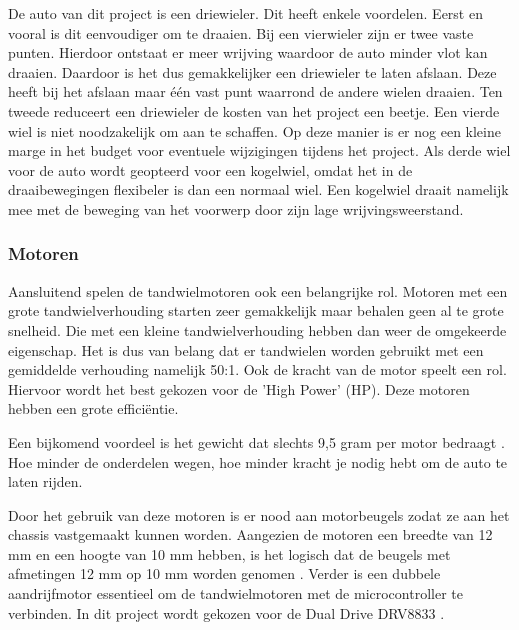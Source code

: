 \documentclass[a4paper,twoside,kulak]{kulakreport} %
\begin{document}
De auto van dit project is een driewieler. Dit heeft enkele voordelen. Eerst en vooral is dit eenvoudiger om te draaien. Bij een vierwieler zijn er twee vaste punten. Hierdoor ontstaat er meer wrijving waardoor de auto minder vlot kan draaien. Daardoor is het dus gemakkelijker een driewieler te laten afslaan. Deze heeft bij het afslaan maar één vast punt waarrond de andere wielen draaien. 
Ten tweede reduceert een driewieler de kosten van het project een beetje. Een vierde wiel is niet noodzakelijk om aan te schaffen. Op deze manier is er nog een kleine marge in het budget voor eventuele wijzigingen tijdens het project. Als derde wiel voor de auto wordt geopteerd voor een kogelwiel, omdat het in de draaibewegingen flexibeler is dan een normaal wiel. Een kogelwiel draait namelijk mee met de beweging van het voorwerp door zijn lage wrijvingsweerstand.
\label{Wielen}


\subsubsection{Motoren}
Aansluitend spelen de tandwielmotoren ook een belangrijke rol. Motoren met een grote tandwielverhouding starten zeer gemakkelijk maar behalen geen al te grote snelheid. Die met een kleine tandwielverhouding hebben dan weer de omgekeerde eigenschap. Het is dus van belang dat er tandwielen worden gebruikt met een gemiddelde verhouding namelijk 50:1. Ook de kracht van de motor speelt een rol. Hiervoor wordt het best gekozen voor de 'High Power' (HP). Deze motoren hebben een grote efficiëntie. 

Een bijkomend voordeel is het gewicht dat slechts 9,5 gram per motor bedraagt \cite{MicroMetalGearMotor50:1HP}. %
Hoe minder de onderdelen wegen, hoe minder kracht je nodig hebt om de auto te laten rijden. 

Door het gebruik van deze motoren is er nood aan motorbeugels zodat ze aan het chassis vastgemaakt kunnen worden. Aangezien de motoren een breedte van 12 mm en een hoogte van 10 mm hebben, is het logisch dat de beugels met afmetingen 12 mm op 10 mm worden genomen \cite{MicroMetalGearMotorBeugel}.
Verder is een dubbele aandrijfmotor essentieel om de tandwielmotoren met de microcontroller te verbinden. In dit project wordt gekozen voor de Dual Drive DRV8833 \cite{DualDriveDRV8833}. 
\label{Motoren}
\end{document}
